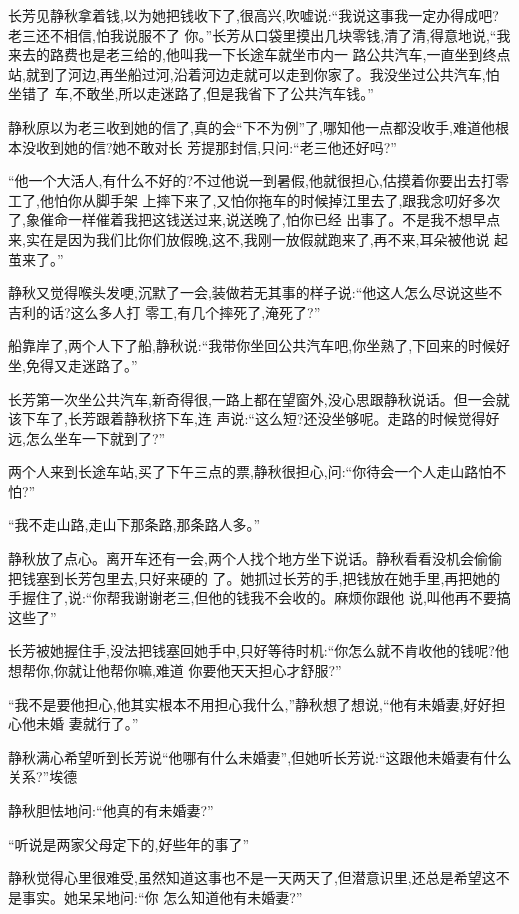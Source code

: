 ﻿\documentclass[12pt]{article}
\begin{document}
长芳见静秋拿着钱,以为她把钱收下了,很高兴,吹嘘说:``我说这事我一定办得成吧?老三还不相信,怕我说服不了
你。''长芳从口袋里摸出几块零钱,清了清,得意地说,``我来去的路费也是老三给的,他叫我一下长途车就坐市内一
路公共汽车,一直坐到终点站,就到了河边,再坐船过河,沿着河边走就可以走到你家了。我没坐过公共汽车,怕坐错了
车,不敢坐,所以走迷路了,但是我省下了公共汽车钱。''

静秋原以为老三收到她的信了,真的会``下不为例''了,哪知他一点都没收手,难道他根本没收到她的信?她不敢对长
芳提那封信,只问:``老三\myrule 他还好吗?''

``他一个大活人,有什么不好的?不过他说一到暑假,他就很担心,估摸着你要出去打零工了,他怕你\myrule 从脚手架
上摔下来了,又怕你拖车的时候掉江里去了,跟我念叨好多次了,象催命一样催着我把这钱送过来,说送晚了,怕你已经
\myrule 出事了。不是我不想早点来,实在是因为我们比你们放假晚,这不,我刚一放假就跑来了,再不来,耳朵被他说
起茧来了。''

静秋又觉得喉头发哽,沉默了一会,装做若无其事的样子说:``他这人怎么\myrule 尽说这些不吉利的话?这么多人打
零工,有几个摔死了,淹死了?''

船靠岸了,两个人下了船,静秋说:``我带你坐回公共汽车吧,你坐熟了,下回来的时候好坐,免得又走迷路了。''

长芳第一次坐公共汽车,新奇得很,一路上都在望窗外,没心思跟静秋说话。但一会就该下车了,长芳跟着静秋挤下车,连
声说:``这么短?还没坐够呢。走路的时候觉得好远,怎么坐车一下就到了?''

两个人来到长途车站,买了下午三点的票,静秋很担心,问:``你待会一个人走山路怕不怕?''

``我不走山路,走山下那条路,那条路人多。''

静秋放了点心。离开车还有一会,两个人找个地方坐下说话。静秋看看没机会偷偷把钱塞到长芳包里去,只好来硬的
了。她抓过长芳的手,把钱放在她手里,再把她的手握住了,说:``你帮我谢谢老三,但他的钱我不会收的。麻烦你跟他
说,叫他再不要搞这些了\myrule ''

长芳被她握住手,没法把钱塞回她手中,只好等待时机:``你怎么就不肯收他的钱呢?他想帮你,你就让他帮你嘛,难道
你要他天天担心才舒服?''

``我不是要他担心,他\myrule 其实根本不用担心我什么,''静秋想了想说,``他有\myrule 未婚妻,好好担心他未婚
妻就行了。''

静秋满心希望听到长芳说``他哪有什么未婚妻'',但她听长芳说:``这跟他未婚妻有什么关系?''埃德

静秋胆怯地问:``他真的有\myrule 未婚妻?''

``听说是两家父母定下的,好些年的事了\myrule ''

静秋觉得心里很难受,虽然知道这事也不是一天两天了,但潜意识里,还总是希望这不是事实。她呆呆地问:``你
\myrule 怎么知道他有\myrule 未婚妻?''
\end{document}
